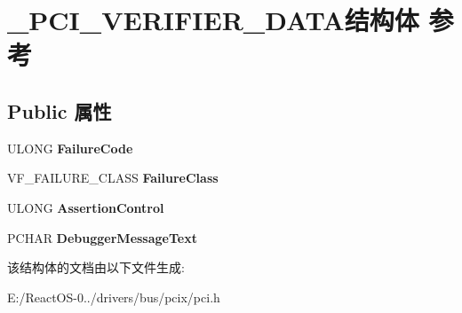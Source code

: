 \hypertarget{struct___p_c_i___v_e_r_i_f_i_e_r___d_a_t_a}{}\section{\+\_\+\+P\+C\+I\+\_\+\+V\+E\+R\+I\+F\+I\+E\+R\+\_\+\+D\+A\+T\+A结构体 参考}
\label{struct___p_c_i___v_e_r_i_f_i_e_r___d_a_t_a}
\subsection*{Public 属性}
\begin{DoxyCompactItemize}
\item 
\mbox{\label{struct___p_c_i___v_e_r_i_f_i_e_r___d_a_t_a_a72e9b2e7aaa0748927170ddf3d9092a7}} 
U\+L\+O\+NG {\bfseries Failure\+Code}
\item 
\mbox{\label{struct___p_c_i___v_e_r_i_f_i_e_r___d_a_t_a_ac1b1e4d0572316dbf6738c75da56dff4}} 
V\+F\+\_\+\+F\+A\+I\+L\+U\+R\+E\+\_\+\+C\+L\+A\+SS {\bfseries Failure\+Class}
\item 
\mbox{\label{struct___p_c_i___v_e_r_i_f_i_e_r___d_a_t_a_ad513cbeee0e672ca4dda5ab37ffdfd94}} 
U\+L\+O\+NG {\bfseries Assertion\+Control}
\item 
\mbox{\label{struct___p_c_i___v_e_r_i_f_i_e_r___d_a_t_a_aca50729145d01d137b014d27ab5a3d12}} 
P\+C\+H\+AR {\bfseries Debugger\+Message\+Text}
\end{DoxyCompactItemize}


该结构体的文档由以下文件生成\+:\begin{DoxyCompactItemize}
\item 
E\+:/\+React\+O\+S-\/0../drivers/bus/pcix/pci.\+h\end{DoxyCompactItemize}
